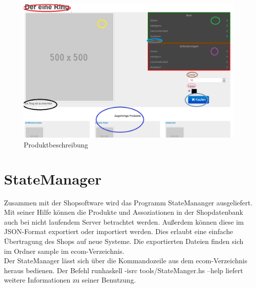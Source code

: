 \begin{figure}[h!]
  \centering
  \includegraphics[width=\textwidth]{img/Produktbeschreibung.png}
  \caption{Produktbeschreibung}
  \label{fig:Produktbeschreibung}
\end{figure}


\section{StateManager}
Zusammen mit der Shopsoftware wird das Programm StateMananger ausgeliefert. Mit seiner Hilfe können die Produkte und Assoziationen in der Shopdatenbank auch bei nicht laufendem Server betrachtet werden. Außerdem können diese im \textsf{JSON}-Format exportiert oder importiert werden. Dies erlaubt eine einfache Übertragung des Shops auf neue Systeme. Die exportierten Dateien finden sich im Ordner sample im \textsf{ecom}-Verzeichnis. \\
Der StateManager lässt sich über die Kommandozeile aus dem ecom-Verzeichnis heraus bedienen. Der Befehl \textsf{runhaskell -isrc tools/StateManger.hs --help} liefert weitere Informationen zu seiner Benutzung. 